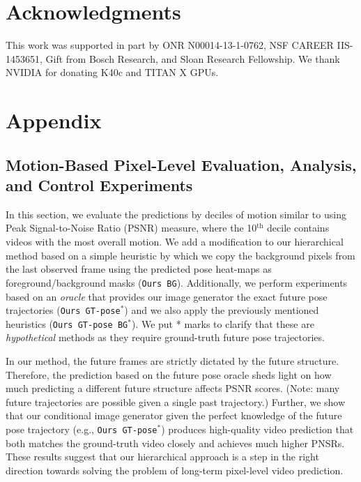 \documentclass{article}
\newcommand{\cutsectionup}{\vspace*{-0.1in}}
\newcommand{\cutsectiondown}{\vspace*{-0.05in}}
\newcommand{\cutsubsectionup}{\vspace*{-0.09in}}
\newcommand{\cutsubsectiondown}{\vspace*{-0.04in}}
\newcommand{\cutsectionup}{}
\newcommand{\cutsectiondown}{}
\newcommand{\cutsubsectionup}{}
\newcommand{\cutsubsectiondown}{}
\begin{document}
\cutsectionup\section*{Acknowledgments}\cutsectiondown
This work was supported in part by ONR N00014-13-1-0762, NSF CAREER
IIS-1453651, Gift from Bosch Research, and Sloan Research Fellowship.
We thank NVIDIA for donating K40c and TITAN X GPUs.






\clearpage\newpage\onecolumn\section*{\fontsize{15}{18}\selectfont Appendix}\begin{appendix}
\section{Motion-Based Pixel-Level Evaluation, Analysis, and Control Experiments}
\cutsubsectiondown
In this section, we evaluate the predictions by deciles of motion similar to \citet{Villegas17} using Peak Signal-to-Noise Ratio (PSNR) measure, where the 10$^{\text{th}}$ decile contains videos with the most overall motion.
We add a modification to our hierarchical method based on a simple heuristic by which we copy the background pixels from the last observed frame using the predicted pose heat-maps as foreground/background masks (\texttt{Ours BG}).
Additionally, we perform experiments based on an \emph{oracle} that provides our image generator the exact future pose trajectories (\texttt{Ours GT-pose$^*$}) and we also apply the previously mentioned heuristics (\texttt{Ours GT-pose BG$^*$}). We put * marks to clarify that these are \emph{hypothetical} methods as they require ground-truth future pose trajectories. 

In our method, the future frames are strictly dictated by the future structure.
Therefore, the prediction based on the future pose oracle sheds light on how much predicting a different future structure affects PSNR scores. 
(Note: many future trajectories are possible given a single past trajectory.)
Further, we show that our conditional image generator given the perfect knowledge of the future pose trajectory (e.g., \texttt{Ours GT-pose$^*$}) produces high-quality video prediction that both matches the ground-truth video closely and achieves much higher PNSRs. 
These results suggest that our hierarchical approach is a step in the right direction towards solving the problem of long-term pixel-level video prediction.


\end{appendix}
\end{document}
